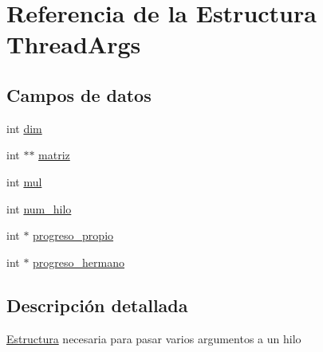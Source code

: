 \hypertarget{structThreadArgs}{\section{Referencia de la Estructura Thread\-Args}
\label{structThreadArgs}
}
\subsection*{Campos de datos}
\begin{DoxyCompactItemize}
\item 
int \hyperlink{structThreadArgs_aa8b404d63d12ecf9fe2e7931a6e3402a}{dim}
\item 
int $\ast$$\ast$ \hyperlink{structThreadArgs_af325a287ef529e08ac2f1cb0f223b696}{matriz}
\item 
int \hyperlink{structThreadArgs_a1bf04327201dd153e50895ea1b8e9ca0}{mul}
\item 
int \hyperlink{structThreadArgs_a63a99447b50d466b77759dbe635af785}{num\-\_\-hilo}
\item 
int $\ast$ \hyperlink{structThreadArgs_a2a69690c663d2d50d808de734f46a67d}{progreso\-\_\-propio}
\item 
int $\ast$ \hyperlink{structThreadArgs_adb9645ac234d5278d06c1450af517fad}{progreso\-\_\-hermano}
\end{DoxyCompactItemize}


\subsection{Descripción detallada}
\hyperlink{structEstructura}{Estructura} necesaria para pasar varios argumentos a un hilo 

